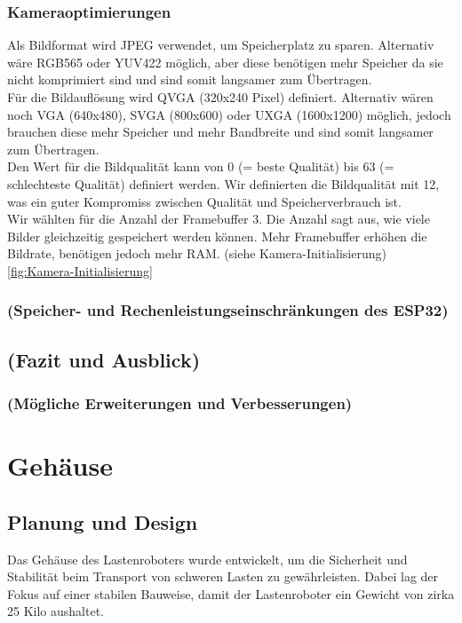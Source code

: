 \documentclass[ngerman,12pt,a4paper]{article}
\begin{document}
							\subsubsection*{Kameraoptimierungen}
	Als Bildformat wird JPEG verwendet, um Speicherplatz zu sparen. Alternativ wäre RGB565 oder YUV422 möglich, aber diese benötigen mehr Speicher da sie nicht komprimiert sind und sind somit langsamer zum Übertragen. \\[0.5cm]
	Für die Bildauflösung wird QVGA (320x240 Pixel) definiert. Alternativ wären noch VGA (640x480), SVGA (800x600) oder UXGA (1600x1200) möglich, jedoch brauchen diese mehr Speicher und mehr Bandbreite und sind somit langsamer zum Übertragen.\\[0.5cm]
	Den Wert für die Bildqualität kann von 0 (= beste Qualität) bis 63 (= schlechteste Qualität) definiert werden. Wir definierten die Bildqualität mit 12, was ein guter Kompromiss zwischen Qualität und Speicherverbrauch ist.\\[0.5cm]
	Wir wählten für die Anzahl der Framebuffer 3. Die Anzahl sagt aus, wie viele Bilder gleichzeitig gespeichert werden können. Mehr Framebuffer erhöhen die Bildrate, benötigen jedoch mehr RAM. (siehe Kamera-Initialisierung) \ref{fig:Kamera-Initialisierung}\\[0.5cm]
	
			\subsubsection{(Speicher- und Rechenleistungseinschränkungen des ESP32)}
					
		\subsection{(Fazit und Ausblick)}
		
			\subsubsection{(Mögliche Erweiterungen und Verbesserungen)}
	\newpage
	\section{Gehäuse}
	
		\subsection{Planung und Design} %
		
		Das Gehäuse des Lastenroboters wurde entwickelt, um die Sicherheit und Stabilität beim Transport von schweren Lasten zu gewährleisten. Dabei lag der Fokus auf einer stabilen Bauweise, damit der Lastenroboter ein Gewicht von zirka 25 Kilo aushaltet. 
		
\end{document}
